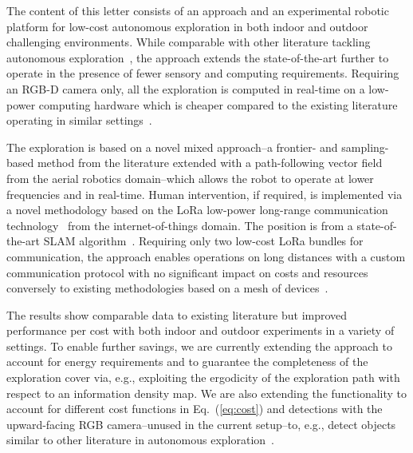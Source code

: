 \documentclass[lettersize,journal]{IEEEtran}
\theoremstyle{definition}
\begin{document}
The content of this letter consists of an %
approach and an experimental robotic platform for low-cost autonomous exploration in both indoor and outdoor challenging environments. While comparable with other literature tackling autonomous exploration~\cite{lluvia2021active,placed2022survey,julia2012comparison}, the approach extends the state-of-the-art further to operate in the presence of fewer sensory and computing requirements. Requiring an RGB-D camera only, all the exploration is computed in real-time on a low-power computing hardware which is cheaper compared to the existing literature operating in similar settings~\cite{roucek2020darpa,tranzatto2022cerberus,kim2022autonomous,dang2019graph}. 

The exploration is based on a novel mixed approach--a frontier- and sampling-based method from the literature extended with a path-following vector field~\cite{seewald2022energy,garcia2017guidance,seewaldphdthesis} from the aerial robotics domain--which allows the robot to operate at lower frequencies and in real-time. 
Human intervention, if required, is implemented via a novel methodology based on the LoRa low-power long-range communication technology~\cite{shanmuga2020survey} from the internet-of-things domain. The position is from a state-of-the-art SLAM algorithm~\cite{labbe2019rtab}.
Requiring only two low-cost LoRa bundles for communication, the approach enables operations on long distances with a custom communication protocol with no significant impact on costs and resources conversely to existing methodologies based on a mesh of devices~\cite{surmann2003autonomous,tardioli2019ground,ebadi2020lamp,roucek2020darpa,tranzatto2022cerberus,kulkarni2022autonomous}.

The results show comparable data to existing literature but improved performance per cost with both indoor and outdoor experiments in a variety of settings. To enable further savings, we are currently extending the approach to account for energy requirements and to guarantee the completeness of the exploration cover via, e.g., exploiting the ergodicity of the exploration path with respect to an information density map.
We are also extending the functionality to account for different cost functions in Eq.~(\ref{eq:cost}) and detections with the upward-facing RGB camera--unused in the current setup--to, e.g., detect objects similar to other literature in autonomous exploration~\cite{kulkarni2022autonomous,tranzatto2022cerberus,roucek2020darpa,ebadi2020lamp}.


\end{document}
